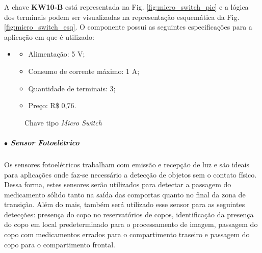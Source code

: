     
    A chave \textbf{KW10-B} está representada na Fig. \ref{fig:micro_switch_pic} e a lógica dos terminais podem ser visualizadas na representação esquemática da Fig. \ref{fig:micro_switch_esq}. O componente possui as seguintes especificações para a aplicação em que é utilizado:
    
   \begin{itemize}
    \item[ ]
        \begin{itemize}
            \item Alimentação: 5 V;
            \item Consumo de corrente máximo: 1 A;
            \item Quantidade de terminais: 3;
            \item Preço: R\$ 0,76.
        \end{itemize}
    \end{itemize}
    
    \begin{figure}[H]
        \centering
        \hspace{0.1\textwidth}
        \caption{Chave tipo \textit{Micro Switch}}\label{fig:micro_switch}
    \end{figure}
    
    \subparagraph*{$\bullet$ Sensor Fotoelétrico} \hfill
    
    Os sensores fotoelétricos trabalham com emissão e recepção de luz e são ideais para aplicações onde faz-se necessário a detecção de objetos sem o contato físico. Dessa forma, estes sensores serão utilizados para detectar a passagem do medicamento sólido tanto na saída das comportas quanto no final da zona de transição. Além do mais, também será utilizado esse sensor para as seguintes detecções: presença do copo no reservatórios de copos, identificação da presença do copo em local predeterminado para o processamento de imagem, passagem do copo com medicamentos errados para o compartimento traseiro e passagem do copo para o compartimento frontal.
    
